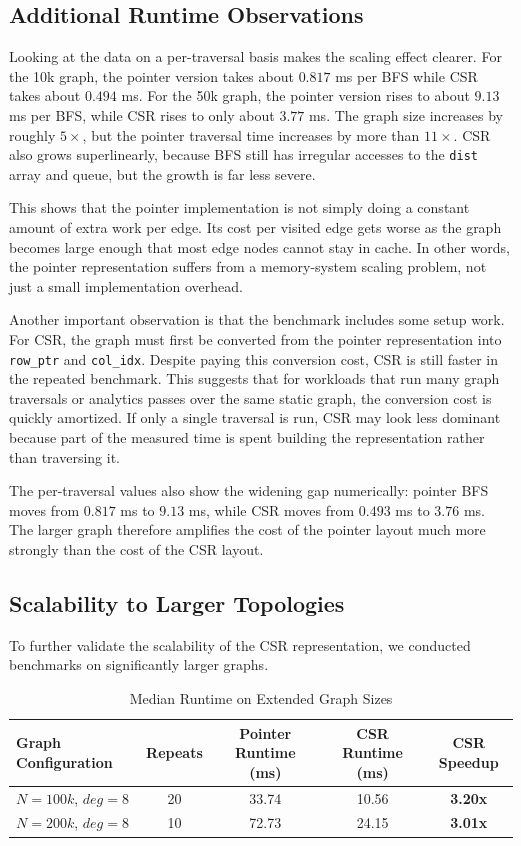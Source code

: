 \documentclass[11pt]{article}
\begin{document}
\subsection{Additional Runtime Observations}

Looking at the data on a per-traversal basis makes the scaling effect clearer. For the 10k graph, the pointer version takes about $0.817$ ms per BFS while CSR takes about $0.494$ ms. For the 50k graph, the pointer version rises to about $9.13$ ms per BFS, while CSR rises to only about $3.77$ ms. The graph size increases by roughly $5\times$, but the pointer traversal time increases by more than $11\times$. CSR also grows superlinearly, because BFS still has irregular accesses to the \texttt{dist} array and queue, but the growth is far less severe.

This shows that the pointer implementation is not simply doing a constant amount of extra work per edge. Its cost per visited edge gets worse as the graph becomes large enough that most edge nodes cannot stay in cache. In other words, the pointer representation suffers from a memory-system scaling problem, not just a small implementation overhead.

Another important observation is that the benchmark includes some setup work. For CSR, the graph must first be converted from the pointer representation into \texttt{row\_ptr} and \texttt{col\_idx}. Despite paying this conversion cost, CSR is still faster in the repeated benchmark. This suggests that for workloads that run many graph traversals or analytics passes over the same static graph, the conversion cost is quickly amortized. If only a single traversal is run, CSR may look less dominant because part of the measured time is spent building the representation rather than traversing it.

The per-traversal values also show the widening gap numerically: pointer BFS moves from $0.817$ ms to $9.13$ ms, while CSR moves from $0.493$ ms to $3.76$ ms. The larger graph therefore amplifies the cost of the pointer layout much more strongly than the cost of the CSR layout.

\subsection{Scalability to Larger Topologies}

To further validate the scalability of the CSR representation, we conducted benchmarks on significantly larger graphs. 

\begin{table}[H]
\centering
\caption{Median Runtime on Extended Graph Sizes}
\vspace{0.2cm}
\begin{tabular}{@{}lcccc@{}}
\toprule
\textbf{Graph Configuration} & \textbf{Repeats} & \textbf{Pointer Runtime (ms)} & \textbf{CSR Runtime (ms)} & \textbf{CSR Speedup} \\ \midrule
$N=100k$, $deg=8$   & 20 & 33.74 & 10.56 & \textbf{3.20x} \\
$N=200k$, $deg=8$   & 10 & 72.73 & 24.15 & \textbf{3.01x} \\ \bottomrule
\end{tabular}
\end{table}
\end{document}
